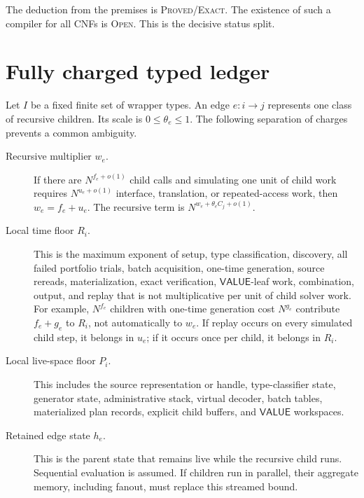 \documentclass[11pt]{article}
\newcommand{\VALUE}{\mathsf{VALUE}}
\begin{document}
The deduction from the premises is \textsc{Proved/Exact}.  The existence of
such a compiler for all CNFs is \textsc{Open}.  This is the decisive status
split.

\section{Fully charged typed ledger}\label{sec:ledger}

Let \(I\) be a fixed finite set of wrapper types.  An edge
\(e:i\to j\) represents one class of recursive children.  Its scale is
\(0\le\theta_e\le1\).  The following separation of charges prevents a
common ambiguity.

\begin{description}
\item[Recursive multiplier \(w_e\).]
If there are \(N^{f_e+o(1)}\) child calls and simulating one unit of child work
requires \(N^{u_e+o(1)}\) interface, translation, or repeated-access work,
then \(w_e=f_e+u_e\).  The recursive term is
\(N^{w_e+\theta_e C_j+o(1)}\).

\item[Local time floor \(R_i\).]
This is the maximum exponent of setup, type classification, discovery, all
failed portfolio trials, batch acquisition, one-time generation, source
rereads, materialization, exact verification, \(\VALUE\)-leaf work,
combination, output, and replay that is not multiplicative per unit of child
solver work.  For example, \(N^{f_e}\) children with one-time generation
cost \(N^{g_e}\) contribute \(f_e+g_e\) to \(R_i\), not automatically to
\(w_e\).  If replay occurs on every simulated child step, it belongs in
\(u_e\); if it occurs once per child, it belongs in \(R_i\).

\item[Local live-space floor \(P_i\).]
This includes the source representation or handle, type-classifier state,
generator state, administrative stack, virtual decoder, batch tables,
materialized plan records, explicit child buffers, and \(\VALUE\) workspaces.

\item[Retained edge state \(h_e\).]
This is the parent state that remains live while the recursive child runs.
Sequential evaluation is assumed.  If children run in parallel, their
aggregate memory, including fanout, must replace this streamed bound.
\end{description}
\end{document}
